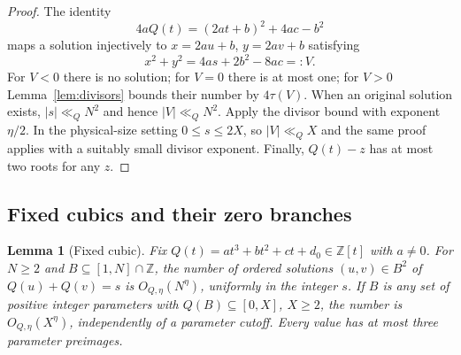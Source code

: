 \documentclass[11pt]{article}
\newtheorem{lemma}[theorem]{Lemma}
\theoremstyle{definition}
\theoremstyle{remark}
\numberwithin{equation}{section}
\newcommand{\Z}{\mathbb Z}
\begin{document}
\begin{proof}
The identity
\begin{equation}\label{eq:quadraticidentity}
       4aQ(t)=(2at+b)^2+4ac-b^2
\end{equation}
maps a solution injectively to $x=2au+b$, $y=2av+b$ satisfying
\begin{equation}\label{eq:quadraticnorm}
             x^2+y^2=4as+2b^2-8ac=:V.
\end{equation}
For $V<0$ there is no solution; for $V=0$ there is at most one;
for $V>0$ Lemma~\ref{lem:divisors} bounds their number by $4\tau(V)$.
When an original solution exists, $|s|\ll_QN^2$ and hence
$|V|\ll_QN^2$. Apply the divisor bound with exponent $\eta/2$.
In the physical-size setting $0\le s\le2X$, so
$|V|\ll_QX$ and the same proof applies with a suitably small
divisor exponent. Finally, $Q(t)-z$ has at most two roots for any $z$.
\end{proof}

\subsection{Fixed cubics and their zero branches}

\begin{lemma}[Fixed cubic]\label{lem:cubic}
Fix $Q(t)=at^3+bt^2+ct+d_0\in\Z[t]$ with $a\ne0$.
For $N\ge2$ and $B\subseteq[1,N]\cap\Z$, the number of ordered
solutions $(u,v)\in B^2$ of $Q(u)+Q(v)=s$ is
$O_{Q,\eta}(N^\eta)$, uniformly in the integer $s$.
If $B$ is any set of \emph{positive} integer parameters with
$Q(B)\subseteq[0,X]$, $X\ge2$, the number is
$O_{Q,\eta}(X^\eta)$, independently of a parameter cutoff.
Every value has at most three parameter preimages.
\end{lemma}
\end{document}
